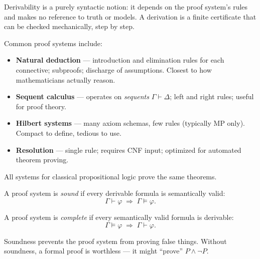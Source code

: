 \begin{remark}
Derivability is a purely syntactic notion: it depends on the proof system's rules
and makes no reference to truth or models. A derivation is a finite certificate
that can be checked mechanically, step by step.
\end{remark}

\begin{remark}
Common proof systems include:
\begin{itemize}
  \item \textbf{Natural deduction} — introduction and elimination rules for each
        connective; subproofs; discharge of assumptions. Closest to how
        mathematicians actually reason.
  \item \textbf{Sequent calculus} — operates on \emph{sequents} $\Gamma\vdash\Delta$;
        left and right rules; useful for proof theory.
  \item \textbf{Hilbert systems} — many axiom schemas, few rules (typically MP
        only). Compact to define, tedious to use.
  \item \textbf{Resolution} — single rule; requires CNF input; optimized for
        automated theorem proving.
\end{itemize}
All systems for classical propositional logic prove the same theorems.
\end{remark}

\begin{tcolorbox}[colback=propbox, colframe=propborder, arc=2pt,
  left=6pt, right=6pt, top=4pt, bottom=4pt,
  title={\small\textbf{Definitions (Soundness and Completeness)}},
  fonttitle=\small\bfseries]
\label{def:pl-soundness}
A proof system is \emph{sound} if every derivable formula is semantically valid:
\[
\Gamma \vdash \varphi \;\Rightarrow\; \Gamma \models \varphi.
\]

\label{def:pl-completeness}
A proof system is \emph{complete} if every semantically valid formula is
derivable:
\[
\Gamma \models \varphi \;\Rightarrow\; \Gamma \vdash \varphi.
\]
\end{tcolorbox}

\begin{remark}
Soundness prevents the proof system from proving false things. Without soundness,
a formal proof is worthless — it might ``prove'' $P \wedge \neg P$.
\end{remark}

